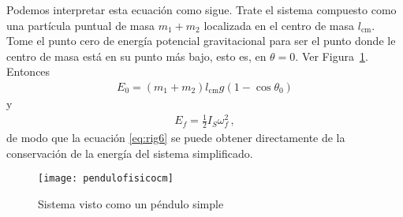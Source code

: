 \begin{itemize}
Podemos interpretar esta ecuación como sigue. Trate el sistema compuesto como una partícula puntual de masa $m_1+m_2$ localizada en el centro de masa $l_{\text{cm}}$. Tome el punto cero de energía potencial gravitacional para ser el punto donde le centro de masa está en su punto más bajo, esto es, en $\theta=0$. Ver Figura~\ref{fig:pendulofisicocm}. Entonces
\begin{align}
  E_0=(m_1+m_2)l_{\text{cm}} g \left(1-\cos\theta_0  \right)
\end{align}
y
\begin{align}
  E_f=\frac{1}{2}I_S \omega_f^2\,,
\end{align}
de modo que la ecuación \eqref{eq:rig6} se puede obtener directamente de la conservación de la energía del sistema simplificado.
\begin{figure}
  \centering
  \texttt{[image: pendulofisicocm]}
  \caption{Sistema visto como un péndulo simple}
  \label{fig:pendulofisicocm}
\end{figure}

\end{itemize}

